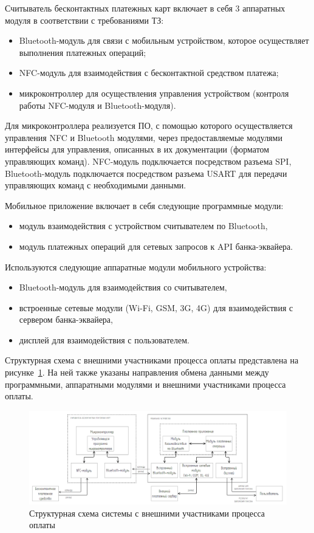 Считыватель бесконтактных платежных карт включает в себя 3 аппаратных модуля в соответствии с требованиями ТЗ:
\begin{itemize}
    \item Bluetooth-модуль для связи с мобильным устройством, которое осуществляет выполнения платежных операций;
    \item NFC-модуль для взаимодействия с бесконтактной средством платежа;
    \item микроконтроллер для осуществления управления устройством (контроля работы NFC-модуля и Bluetooth-модуля).
\end{itemize}

Для микроконтроллера реализуется ПО, с помощью которого осуществляется управления NFC и Bluetooth модулями, через предоставляемые модулями интерфейсы для управления, описанных в их документации (форматом управляющих команд).
NFC-модуль подключается посредством разъема SPI, Bluetooth-модуль подключается посредством разъема USART для передачи управляющих команд с необходимыми данными.


Мобильное приложение включает в себя следующие программные модули:
\begin{itemize}
    \item модуль взаимодействия с устройством считывателем по Bluetooth,
    \item модуль платежных операций для сетевых запросов к API банка-эквайера.
\end{itemize}

Используются следующие аппаратные модули мобильного устройства:
\begin{itemize}
    \item Bluetooth-модуль для взаимодействия со считывателем,
    \item встроенные сетевые модули (Wi-Fi, GSM, 3G, 4G) для взаимодействия с сервером банка-эквайера,
    \item дисплей для взаимодействия с пользователем.
\end{itemize}

Структурная схема с внешними участниками процесса оплаты представлена на рисунке~\ref{fig:struct_scheme_out}.
На ней также указаны направления обмена данными между программными, аппаратными модулями и внешними участниками процесса оплаты.

\begin{figure}[H]
    \centering
    \includegraphics[width=1\textwidth]{images/design/struct_scheme_out}
    \caption{\centering Структурная схема системы с внешними участниками процесса оплаты}
    \label{fig:struct_scheme_out}
\end{figure}


